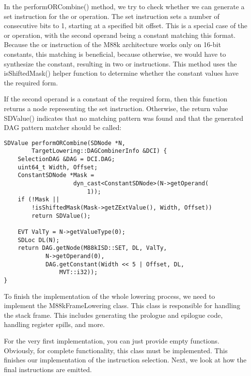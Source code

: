 In the performORCombine() method, we try to check whether we can generate a set instruction for the or operation. The set instruction sets a number of consecutive bits to 1, starting at a specified bit offset. This is a special case of the or operation, with the second operand being a constant matching this format. Because the or instruction of the M88k architecture works only on 16-bit constants, this matching is beneficial, because otherwise, we would have to synthesize the constant, resulting in two or instructions. This method uses the isShiftedMask() helper function to determine whether the constant values have the required form.\par

If the second operand is a constant of the required form, then this  function returns a node representing the set instruction. Otherwise, the return value  SDValue() indicates that no matching pattern was found and that the generated DAG pattern matcher should be called:\par

\begin{lstlisting}[caption={}]
SDValue performORCombine(SDNode *N,
		TargetLowering::DAGCombinerInfo &DCI) {
	SelectionDAG &DAG = DCI.DAG;
	uint64_t Width, Offset;
	ConstantSDNode *Mask =
					dyn_cast<ConstantSDNode>(N->getOperand(
						1));
	if (!Mask ||
		!isShiftedMask(Mask->getZExtValue(), Width, Offset))
		return SDValue();
	
	EVT ValTy = N->getValueType(0);
	SDLoc DL(N);
	return DAG.getNode(M88kISD::SET, DL, ValTy,
			N->getOperand(0),
			DAG.getConstant(Width << 5 | Offset, DL,
				MVT::i32));
}
\end{lstlisting}

To finish the implementation of the whole lowering process, we need to implement the M88kFrameLowering class. This class is responsible for handling the stack frame. This includes generating the prologue and epilogue code, handling register spills, and more.\par

For the very first implementation, you can just provide empty functions. Obviously, for complete functionality, this class must be implemented. This finishes our implementation of the instruction selection. Next, we look at how the final instructions are emitted.\par





























